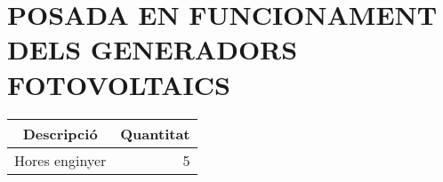 \chapter{\uppercase{Posada en funcionament dels generadors fotovoltaics}}

\begin{table}[H]
  \begin{center}
    \begin{tabularx} {\textwidth} {|X|r|} \hline
  \multicolumn{1}{|c|}{Descripció} &  \multicolumn{1}{c|}{Quantitat}\\ \hline \hline
    Hores enginyer & 5 \\ \hline
    \end{tabularx}%
  \end{center}

  \label{tab:addlabel}%
\end{table}%

\clearpage